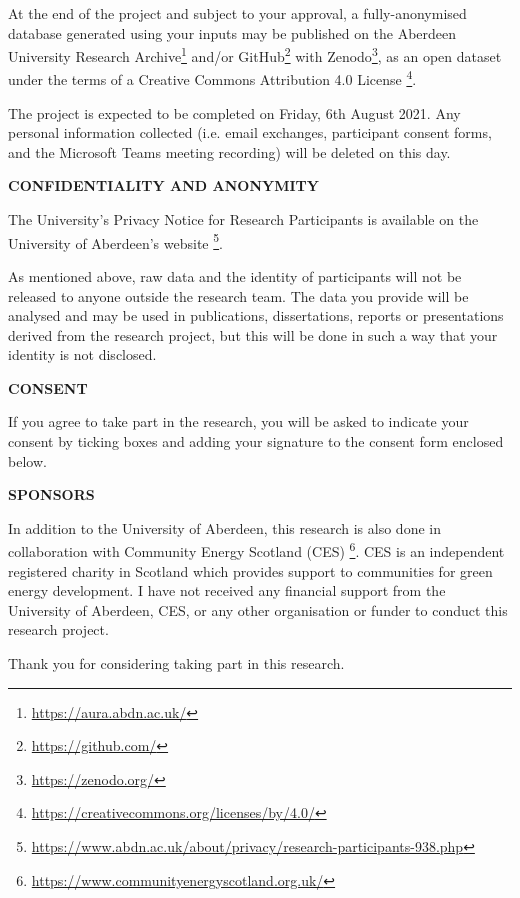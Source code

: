 {At the end of the project and subject to your approval, a fully-anonymised
database generated using your inputs may be published on the Aberdeen
University Research Archive\footnote{\url{https://aura.abdn.ac.uk/}} and/or
GitHub\footnote{\url{https://github.com/}} with
Zenodo\footnote{\url{https://zenodo.org/}}, as an open dataset under the terms
of a Creative Commons Attribution 4.0 License%
\footnote{\url{https://creativecommons.org/licenses/by/4.0/}}.

The project is expected to be completed on Friday, 6th August 2021. Any
personal information collected (i.e. email exchanges, participant consent
forms, and the Microsoft Teams meeting recording) will be deleted on this day.

\vspace{20pt}
\textbf{\MakeUppercase{Confidentiality and anonymity}}

The University's Privacy Notice for Research Participants is available on the
University of Aberdeen's website%
\footnote{\url{https://www.abdn.ac.uk/about/privacy/research-participants-938.php}}.

As mentioned above, raw data and the identity of participants will not be
released to anyone outside the research team. The data you provide will be
analysed and may be used in publications, dissertations, reports or
presentations derived from the research project, but this will be done in such
a way that your identity is not disclosed.

\vspace{20pt}
\textbf{\MakeUppercase{Consent}}

If you agree to take part in the research, you will be asked to indicate your
consent by ticking boxes and adding your signature to the consent form
enclosed below.

\vspace{20pt}
\textbf{\MakeUppercase{Sponsors}}

In addition to the University of Aberdeen, this research is also done in
collaboration with Community Energy Scotland (CES)%
\footnote{\url{https://www.communityenergyscotland.org.uk/}}. CES is an
independent registered charity in Scotland which provides support to
communities for green energy development. I have not received any financial
support from the University of Aberdeen, CES, or any other organisation or
funder to conduct this research project.

\vspace{30pt}
Thank you for considering taking part in this research.

}
